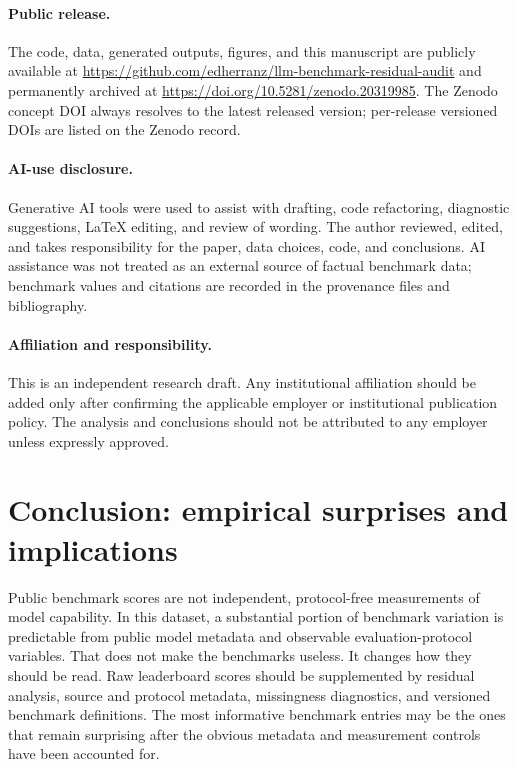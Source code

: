 \documentclass[11pt]{article}
\begin{document}
\paragraph{Public release.} The code, data, generated outputs, figures, and this manuscript are publicly available at \url{https://github.com/edherranz/llm-benchmark-residual-audit} and permanently archived at \url{https://doi.org/10.5281/zenodo.20319985}. The Zenodo concept DOI always resolves to the latest released version; per-release versioned DOIs are listed on the Zenodo record.

\paragraph{AI-use disclosure.} Generative AI tools were used to assist with drafting, code refactoring, diagnostic suggestions, LaTeX editing, and review of wording. The author reviewed, edited, and takes responsibility for the paper, data choices, code, and conclusions. AI assistance was not treated as an external source of factual benchmark data; benchmark values and citations are recorded in the provenance files and bibliography.

\paragraph{Affiliation and responsibility.} This is an independent research draft. Any institutional affiliation should be added only after confirming the applicable employer or institutional publication policy. The analysis and conclusions should not be attributed to any employer unless expressly approved.

\section{Conclusion: empirical surprises and implications}
Public benchmark scores are not independent, protocol-free measurements of model capability. In this dataset, a substantial portion of benchmark variation is predictable from public model metadata and observable evaluation-protocol variables. That does not make the benchmarks useless. It changes how they should be read. Raw leaderboard scores should be supplemented by residual analysis, source and protocol metadata, missingness diagnostics, and versioned benchmark definitions. The most informative benchmark entries may be the ones that remain surprising after the obvious metadata and measurement controls have been accounted for.
\end{document}

